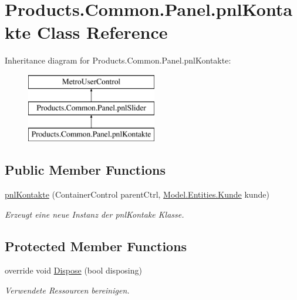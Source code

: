 \hypertarget{class_products_1_1_common_1_1_panel_1_1pnl_kontakte}{}\section{Products.\+Common.\+Panel.\+pnl\+Kontakte Class Reference}
\label{class_products_1_1_common_1_1_panel_1_1pnl_kontakte}
Inheritance diagram for Products.\+Common.\+Panel.\+pnl\+Kontakte\+:\begin{figure}[H]
\begin{center}
\leavevmode
\includegraphics[height=3.000000cm]{class_products_1_1_common_1_1_panel_1_1pnl_kontakte}
\end{center}
\end{figure}
\subsection*{Public Member Functions}
\begin{DoxyCompactItemize}
\item 
\hyperlink{class_products_1_1_common_1_1_panel_1_1pnl_kontakte_af6d57771ea7ad8f884070e5dee24ba58}{pnl\+Kontakte} (Container\+Control parent\+Ctrl, \hyperlink{class_products_1_1_model_1_1_entities_1_1_kunde}{Model.\+Entities.\+Kunde} kunde)
\begin{DoxyCompactList}\small\item\em Erzeugt eine neue Instanz der pnl\+Kontake Klasse. \end{DoxyCompactList}\end{DoxyCompactItemize}
\subsection*{Protected Member Functions}
\begin{DoxyCompactItemize}
\item 
override void \hyperlink{class_products_1_1_common_1_1_panel_1_1pnl_kontakte_aa9494410fad90fdcbdd7b253fa7a9977}{Dispose} (bool disposing)
\begin{DoxyCompactList}\small\item\em Verwendete Ressourcen bereinigen. \end{DoxyCompactList}\end{DoxyCompactItemize}
